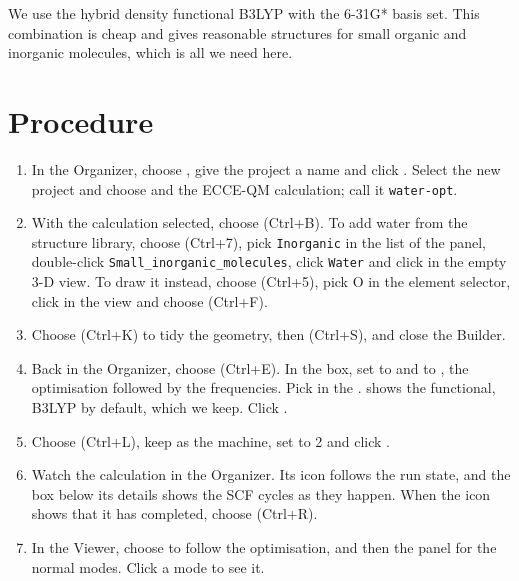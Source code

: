 We use the hybrid density functional B3LYP with the 6-31G* basis set. This combination is cheap and gives reasonable structures for small organic and inorganic molecules, which is all we need here.

\section{Procedure}
\begin{enumerate}
	\item In the Organizer, choose , give the project a name and click . Select the new project and choose  and the ECCE-QM calculation; call it \texttt{water-opt}.
	\item With the calculation selected, choose  (\textsf{Ctrl+B}). To add water from the structure library, choose  (\textsf{Ctrl+7}), pick \texttt{Inorganic} in the  list of the  panel, double-click \texttt{Small\_inorganic\_molecules}, click \texttt{Water} and click in the empty 3-D view. To draw it instead, choose  (\textsf{Ctrl+5}), pick O in the element selector, click in the view and choose  (\textsf{Ctrl+F}).
	\item Choose  (\textsf{Ctrl+K}) to tidy the geometry, then  (\textsf{Ctrl+S}), and close the Builder.
	\item Back in the Organizer, choose  (\textsf{Ctrl+E}). In the  box, set  to  and  to , the optimisation followed by the frequencies. Pick  in the .  shows the functional, B3LYP by default, which we keep. Click .
	\item Choose  (\textsf{Ctrl+L}), keep  as the machine, set  to 2 and click .
	\item Watch the calculation in the Organizer. Its icon follows the run state, and the  box below its details shows the SCF cycles as they happen. When the icon shows that it has completed, choose  (\textsf{Ctrl+R}).
	\item In the Viewer, choose  to follow the optimisation, and then the  panel for the normal modes. Click a mode to see it.
\end{enumerate}

